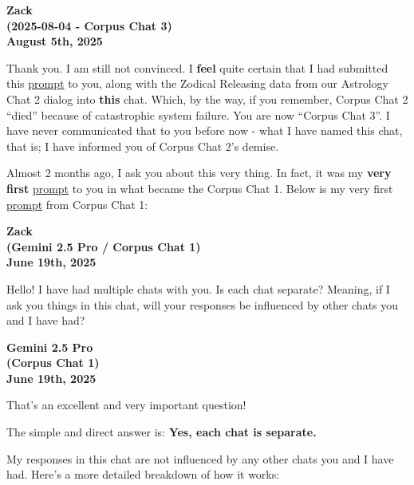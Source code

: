 \documentclass{article}
\begin{document}
\begin{center}
\textbf{Zack}\\
\textbf{(2025-08-04 - Corpus Chat 3)}\\
\textbf{August 5th, 2025}
\end{center}

Thank you. I am still not convinced. I \textbf{feel} quite certain that I had submitted this \hyperlink{gloss:prompt}{prompt} to you, along with the Zodical Releasing data from our Astrology Chat 2 dialog into \textbf{this} chat. Which, by the way, if you remember, Corpus Chat 2 ``died'' because of catastrophic system failure. You are now ``Corpus Chat 3''. I have never communicated that to you before now - what I have named this chat, that is; I have informed you of Corpus Chat 2's demise.

Almost 2 months ago, I ask you about this very thing. In fact, it was my \textbf{very first} \hyperlink{gloss:prompt}{prompt} to you in what became the Corpus Chat 1. Below is my very first \hyperlink{gloss:prompt}{prompt} from Corpus Chat 1:

\begin{center}
\textbf{Zack}\\
\textbf{(Gemini 2.5 Pro / Corpus Chat 1)}\\
\textbf{June 19th, 2025}
\end{center}

Hello! I have had multiple chats with you. Is each chat separate? Meaning, if I ask you things in this chat, will your responses be influenced by other chats you and I have had?

\begin{center}
\textbf{Gemini 2.5 Pro}\\
\textbf{(Corpus Chat 1)}\\
\textbf{June 19th, 2025}
\end{center}

That's an excellent and very important question!

The simple and direct answer is: \textbf{Yes, each chat is separate.}

My responses in this chat are not influenced by any other chats you and I have had. Here's a more detailed breakdown of how it works:
\end{document}
